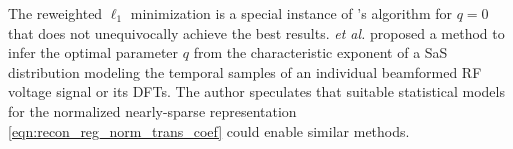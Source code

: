 The reweighted $\ell_{1}$ minimization
\cite{article:CandesJFAA2008} is
a special instance of
's algorithm for
$q = 0$ that does not unequivocally achieve
the best results.
 \emph{et al.} \cite{article:AchimITCI2015} proposed
a method to infer
the optimal parameter $q$ from
the characteristic exponent of
a \acl{SaS} distribution modeling
the temporal samples of
an individual beamformed \ac{RF} voltage signal or
its \acp{DFT}.
The author speculates that
suitable statistical models for
the normalized nearly-sparse representation
\eqref{eqn:recon_reg_norm_trans_coef} could enable
similar methods.
